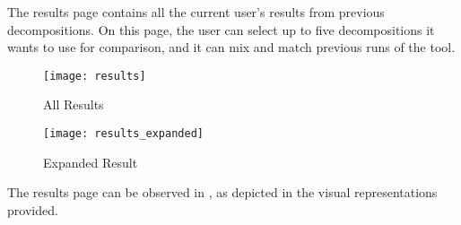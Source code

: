 The results page contains all the current user's results from previous decompositions. On this page, the user can select up to five decompositions it wants to use for comparison, and it can mix and match previous runs of the tool.

\begin{figure*}[!htb]
  \caption{All Results}
  \label{fig:results}
  \centering
  \texttt{[image: results]}
\end{figure*}
\begin{figure*}[!htb]
  \caption{Expanded Result}
  \label{fig:expanded_result}
  \centering
  \texttt{[image: results\_expanded]}
\end{figure*}
The results page can be observed in , as depicted in the visual representations provided.
